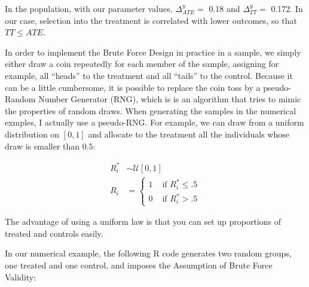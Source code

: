 \documentclass[]{book}
\newenvironment{Shaded}{\begin{snugshade}}{\end{snugshade}}
\newcommand{\CommentTok}[1]{\textcolor[rgb]{0.56,0.35,0.01}{\textit{#1}}}
\newcommand{\DecValTok}[1]{\textcolor[rgb]{0.00,0.00,0.81}{#1}}
\newcommand{\KeywordTok}[1]{\textcolor[rgb]{0.13,0.29,0.53}{\textbf{#1}}}
\newcommand{\NormalTok}[1]{#1}
\newcommand{\OperatorTok}[1]{\textcolor[rgb]{0.81,0.36,0.00}{\textbf{#1}}}
\newcommand{\StringTok}[1]{\textcolor[rgb]{0.31,0.60,0.02}{#1}}
\theoremstyle{definition}
\theoremstyle{definition}
\theoremstyle{definition}
\theoremstyle{remark}
\let\BeginKnitrBlock\begin \let\EndKnitrBlock\end
\begin{document}
In the population, with our parameter values, \(\Delta^y_{ATE}=\) 0.18 and \(\Delta^y_{TT}=\) 0.172.
In our case, selection into the treatment is correlated with lower outcomes, so that \(TT\leq ATE\).

In order to implement the Brute Force Design in practice in a sample, we simply either draw a coin repeatedly for each member of the sample, assigning for example, all ``heads'' to the treatment and all ``tails'' to the control.
Because it can be a little cumbersome, it is possible to replace the coin toss by a pseudo-Random Number Generator (RNG), which is is an algorithm that tries to mimic the properties of random draws.
When generating the samples in the numerical exmples, I actually use a pseudo-RNG.
For example, we can draw from a uniform distribution on \([0,1]\) and allocate to the treatment all the individuals whose draw is smaller than 0.5:

\begin{align*}
  R_i^* & \sim \mathcal{U}[0,1]\\
  R_i & = 
  \begin{cases}
    1 & \text{ if } R_i^*\leq .5 \\
    0 & \text{ if } R_i^*> .5 
  \end{cases}
\end{align*}

The advantage of using a uniform law is that you can set up proportions of treated and controls easily.

\BeginKnitrBlock{example}
\protect\hypertarget{exm:unnamed-chunk-68}{}{\label{exm:unnamed-chunk-68} }In our numerical example, the following R code generates two random groups, one treated and one control, and imposes the Assumption of Brute Force Validity:
\EndKnitrBlock{example}

\begin{Shaded}
\end{Shaded}
\end{document}
